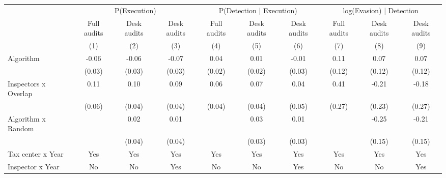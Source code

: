 \begin{tabular}{lccc|ccc|ccc} \toprule
\multicolumn{1}{l}{} & \multicolumn{3}{c}{P(Execution)} & \multicolumn{3}{c}{P(Detection | Execution)} & \multicolumn{3}{c}{log(Evasion) | Detection} \\\cmidrule(lr){2-4}\cmidrule(lr){5-7}\cmidrule(lr){8-10} \multicolumn{1}{l}{} & Full audits & Desk audits & Desk audits & Full audits & Desk audits & Desk audits & Full audits & Desk audits & Desk audits \\ \multicolumn{1}{l}{} & (1) & (2) & (3) & (4) & (5) & (6) & (7) & (8) & (9) \\ \midrule
Algorithm   &       -0.06\sym{*}  &       -0.06\sym{**} &       -0.07\sym{**} &        0.04\sym{**} &        0.01         &       -0.01         &        0.11         &        0.07         &        0.07         \\
            &      (0.03)         &      (0.03)         &      (0.03)         &      (0.02)         &      (0.02)         &      (0.03)         &      (0.12)         &      (0.12)         &      (0.12)         \\
\addlinespace
Inspectors x Overlap&        0.11\sym{*}  &        0.10\sym{**} &        0.09\sym{**} &        0.06         &        0.07\sym{*}  &        0.04         &        0.41         &       -0.21         &       -0.18         \\
            &      (0.06)         &      (0.04)         &      (0.04)         &      (0.04)         &      (0.04)         &      (0.05)         &      (0.27)         &      (0.23)         &      (0.27)         \\
\addlinespace
Algorithm x Random&                     &        0.02         &        0.01         &                     &        0.03         &        0.01         &                     &       -0.25\sym{*}  &       -0.21         \\
            &                     &      (0.04)         &      (0.04)         &                     &      (0.03)         &      (0.03)         &                     &      (0.15)         &      (0.15)         \\
\midrule
Tax center x Year&         Yes         &         Yes         &         Yes         &         Yes         &         Yes         &         Yes         &         Yes         &         Yes         &         Yes         \\
Inspector x Year&          No         &          No         &         Yes         &          No         &          No         &         Yes         &          No         &          No         &         Yes         \\

\end{tabular}

